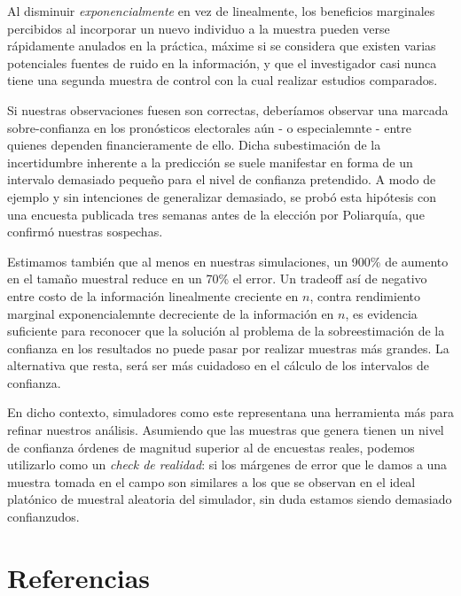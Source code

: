 \documentclass[12pt, a4paper]{article}
\begin{document}
Al disminuir \emph{exponencialmente} en vez de linealmente, los beneficios marginales percibidos al incorporar un nuevo individuo a la muestra pueden verse r\'apidamente anulados en la pr\'actica, m\'axime si se considera que existen varias potenciales fuentes de ruido en la informaci\'on, y que el investigador casi nunca tiene una segunda muestra de control con la cual realizar estudios comparados.  

Si nuestras observaciones fuesen son correctas, deber\'iamos observar una marcada sobre-confianza en los pron\'osticos electorales a\'un - o especialemnte - entre quienes dependen financieramente de ello. Dicha subestimaci\'on de la incertidumbre inherente a la predicci\'on se suele manifestar en forma de un intervalo demasiado peque\~no para el nivel de confianza pretendido. A modo de ejemplo y sin intenciones de generalizar demasiado, se prob\'o esta hip\'otesis con una encuesta publicada tres semanas antes de la elecci\'on por Poliarqu\'ia, que confirm\'o nuestras sospechas.

Estimamos tambi\'en que al menos en nuestras simulaciones, un 900\% de aumento en el tama\~no muestral reduce en un 70\% el error. Un tradeoff as\'i de negativo entre costo de la informaci\'on linealmente creciente en $n$, contra rendimiento marginal exponencialemnte decreciente de la informaci\'on en $n$, es evidencia suficiente para reconocer que la soluci\'on al problema de la sobreestimaci\'on de la confianza en los resultados no puede pasar por realizar muestras m\'as grandes. La alternativa que resta, ser\'a ser m\'as cuidadoso en el c\'alculo de los intervalos de confianza.

En dicho contexto, simuladores como este representana una herramienta m\'as para refinar nuestros an\'alisis. Asumiendo que las muestras que genera tienen un nivel de confianza \'ordenes de magnitud superior al de encuestas reales, podemos utilizarlo como un \textit{check de realidad}: si los m\'argenes de error que le damos a una muestra tomada en el campo son similares a los que se observan en el ideal plat\'onico de muestral aleatoria del simulador, sin duda estamos siendo demasiado confianzudos.
\section{Referencias}
\end{document}
